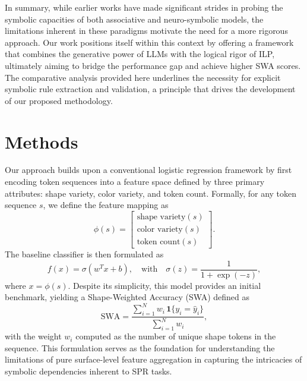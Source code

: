 \documentclass{article}
\begin{document}
In summary, while earlier works have made significant strides in probing the symbolic capacities of both associative and neuro-symbolic models, the limitations inherent in these paradigms motivate the need for a more rigorous approach. Our work positions itself within this context by offering a framework that combines the generative power of LLMs with the logical rigor of ILP, ultimately aiming to bridge the performance gap and achieve higher SWA scores. The comparative analysis provided here underlines the necessity for explicit symbolic rule extraction and validation, a principle that drives the development of our proposed methodology.

\section{Methods}
Our approach builds upon a conventional logistic regression framework by first encoding token sequences into a feature space defined by three primary attributes: shape variety, color variety, and token count. Formally, for any token sequence \( s \), we define the feature mapping as 
\[
\phi(s) = \begin{bmatrix}
\text{shape variety}(s) \\
\text{color variety}(s) \\
\text{token count}(s)
\end{bmatrix}.
\]
The baseline classifier is then formulated as
\[
f(x) = \sigma(w^T x + b), \quad \text{with} \quad \sigma(z) = \frac{1}{1+\exp(-z)},
\]
where \( x = \phi(s) \). Despite its simplicity, this model provides an initial benchmark, yielding a Shape-Weighted Accuracy (SWA) defined as 
\[
\text{SWA} = \frac{\sum_{i=1}^{N} w_i\, \mathbf{1}\{y_i=\hat{y}_i\}}{\sum_{i=1}^{N} w_i},
\]
with the weight \( w_i \) computed as the number of unique shape tokens in the sequence. This formulation serves as the foundation for understanding the limitations of pure surface-level feature aggregation in capturing the intricacies of symbolic dependencies inherent to SPR tasks.
\end{document}

